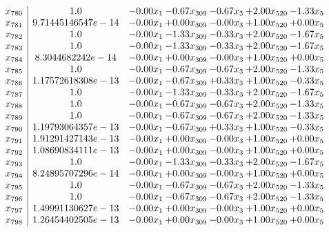 \documentclass[8pt]{article}
\begin{document}
\[\begin{array}{c| c c@{\hskip 2pt} c@{\hskip 2pt} c@{\hskip 2pt} c@{\hskip 2pt} c@{\hskip 2pt} }
 x_{780}   &  1.0 & -0.00 x_{1} & -0.67 x_{309} & -0.67 x_{3} & +  2.00 x_{520} & -1.33 x_{5}\\
 x_{781}   &  9.71445146547e-14 & -0.00 x_{1} & +  0.00 x_{309} & -0.00 x_{3} & +  1.00 x_{520} & +  0.00 x_{5}\\
 x_{782}   &  1.0 & -0.00 x_{1} & -1.33 x_{309} & -0.33 x_{3} & +  2.00 x_{520} & -1.67 x_{5}\\
 x_{783}   &  1.0 & -0.00 x_{1} & -1.33 x_{309} & -0.33 x_{3} & +  2.00 x_{520} & -1.67 x_{5}\\
 x_{784}   &  8.3044682242e-14 & -0.00 x_{1} & +  0.00 x_{309} & -0.00 x_{3} & +  1.00 x_{520} & +  0.00 x_{5}\\
 x_{785}   &  1.0 & -0.00 x_{1} & -0.67 x_{309} & -0.67 x_{3} & +  2.00 x_{520} & -1.33 x_{5}\\
 x_{786}   &  1.17572618308e-13 & -0.00 x_{1} & -0.67 x_{309} & +  0.33 x_{3} & +  1.00 x_{520} & -0.33 x_{5}\\
 x_{787}   &  1.0 & -0.00 x_{1} & -1.33 x_{309} & -0.33 x_{3} & +  2.00 x_{520} & -1.67 x_{5}\\
 x_{788}   &  1.0 & -0.00 x_{1} & -0.67 x_{309} & -0.67 x_{3} & +  2.00 x_{520} & -1.33 x_{5}\\
 x_{789}   &  1.0 & -0.00 x_{1} & -0.67 x_{309} & -0.67 x_{3} & +  2.00 x_{520} & -1.33 x_{5}\\
 x_{790}   &  1.19793064357e-13 & -0.00 x_{1} & -0.67 x_{309} & +  0.33 x_{3} & +  1.00 x_{520} & -0.33 x_{5}\\
 x_{791}   &  1.91291427143e-13 & -0.00 x_{1} & +  0.00 x_{309} & -0.00 x_{3} & +  1.00 x_{520} & +  0.00 x_{5}\\
 x_{792}   &  1.08690834111e-13 & -0.00 x_{1} & +  0.00 x_{309} & -0.00 x_{3} & +  1.00 x_{520} & +  0.00 x_{5}\\
 x_{793}   &  1.0 & -0.00 x_{1} & -1.33 x_{309} & -0.33 x_{3} & +  2.00 x_{520} & -1.67 x_{5}\\
 x_{794}   &  8.24895707296e-14 & -0.00 x_{1} & +  0.00 x_{309} & -0.00 x_{3} & +  1.00 x_{520} & +  0.00 x_{5}\\
 x_{795}   &  1.0 & -0.00 x_{1} & -0.67 x_{309} & -0.67 x_{3} & +  2.00 x_{520} & -1.33 x_{5}\\
 x_{796}   &  1.0 & -0.00 x_{1} & -0.67 x_{309} & -0.67 x_{3} & +  2.00 x_{520} & -1.33 x_{5}\\
 x_{797}   &  1.49991130627e-13 & -0.00 x_{1} & +  0.00 x_{309} & -0.00 x_{3} & +  1.00 x_{520} & +  0.00 x_{5}\\
 x_{798}   &  1.26454402505e-13 & -0.00 x_{1} & +  0.00 x_{309} & -0.00 x_{3} & +  1.00 x_{520} & +  0.00 x_{5}\\

\end{array}\]
\end{document}
